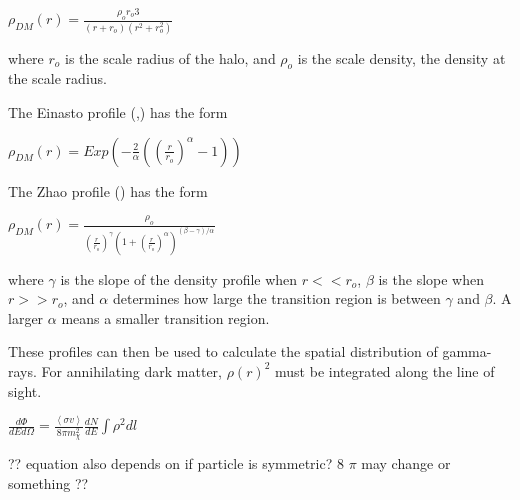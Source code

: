 $ \rho_{DM} \left( r \right) = \frac{ \rho_o r_o3}{ \left( r + r_o \right) \left( r^2 + r_o^2 \right)} $ \label{eqn:burkert}

where $r_o$ is the scale radius of the halo, and $\rho_o$ is the scale density, the density at the scale radius.

The Einasto profile (\cite{einastoprofile1},\cite{einastoprofile2}) has the form

$ \rho_{DM} \left( r \right) = Exp \left( - \frac{2}{\alpha} \left( {\left( \frac{r}{r_o} \right)}^{\alpha} - 1 \right) \right)$ \label{eqn:einasto}

The Zhao profile (\cite{zhaoprofile}) has the form

$ \rho_{DM} \left( r \right) = \frac{\rho_o}{ {\left( \frac{r}{r_o} \right)}^{\gamma} {\left( 1 + {\left( \frac{r}{r_o} \right)}^{\alpha} \right)}^{ \left(\beta - \gamma \right) / \alpha} } $ \label{eqn:zhao}

where $\gamma$ is the slope of the density profile when $r << r_o$, $\beta$ is the slope when $r >> r_o$, and $\alpha$ determines how large the transition region is between $\gamma$ and $\beta$.
A larger $\alpha$ means a smaller transition region.

These profiles can then be used to calculate the spatial distribution of gamma-rays.
For annihilating dark matter, $\rho\left(r\right)^2$ must be integrated along the line of sight.

$ \frac{d\Phi}{dE d\Omega}= \frac{ \left \langle \sigma v \right \rangle }{8 \pi m_\chi^2} \frac{dN}{dE} \int \rho^2 dl $ \label{eqn:dmflux}

?? equation also depends on if particle is symmetric? 8 $\pi$ may change or something ??



